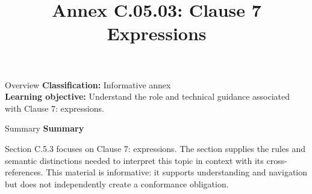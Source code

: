 \documentclass[10pt,letterpaper]{article}
\title{Annex C.05.03: Clause 7 Expressions}
\author{}
\date{}
\begin{document}
\maketitle
\begin{CornellOverviewBox}{Overview}
\textbf{Classification:} Informative annex\\[2pt]
\textbf{Learning objective:} Understand the role and technical guidance associated with Clause 7: expressions.
\end{CornellOverviewBox}\begin{CornellSummaryBox}{Summary}
{\sffamily\bfseries\color{Accent} Summary}\par\vspace{3pt}Section C.5.3 focuses on Clause 7: expressions. The section supplies the rules and semantic distinctions needed to interpret this topic in context with its cross-references. This material is informative: it supports understanding and navigation but does not independently create a conformance obligation.
\end{CornellSummaryBox}
\end{document}
